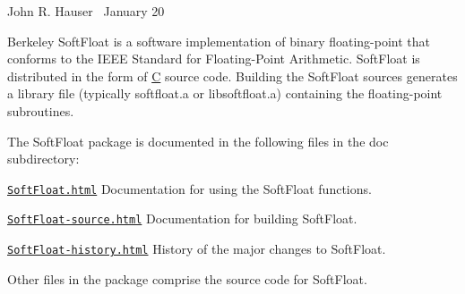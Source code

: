 John R. Hauser~ January 20

Berkeley Soft\+Float is a software implementation of binary floating-\/point that conforms to the I\+E\+EE Standard for Floating-\/\+Point Arithmetic. Soft\+Float is distributed in the form of \mbox{\hyperlink{struct_c}{C}} source code. Building the Soft\+Float sources generates a library file (typically {\ttfamily softfloat.\+a} or {\ttfamily libsoftfloat.\+a}) containing the floating-\/point subroutines.

The Soft\+Float package is documented in the following files in the {\ttfamily doc} subdirectory\+:


\begin{DoxyItemize}
\item \href{http://www.jhauser.us/arithmetic/SoftFloat-3/doc/SoftFloat.html}{\tt Soft\+Float.\+html} Documentation for using the Soft\+Float functions.
\item \href{http://www.jhauser.us/arithmetic/SoftFloat-3/doc/SoftFloat-source.html}{\tt Soft\+Float-\/source.\+html} Documentation for building Soft\+Float.
\item \href{http://www.jhauser.us/arithmetic/SoftFloat-3/doc/SoftFloat-history.html}{\tt Soft\+Float-\/history.\+html} History of the major changes to Soft\+Float.
\end{DoxyItemize}

Other files in the package comprise the source code for Soft\+Float. 